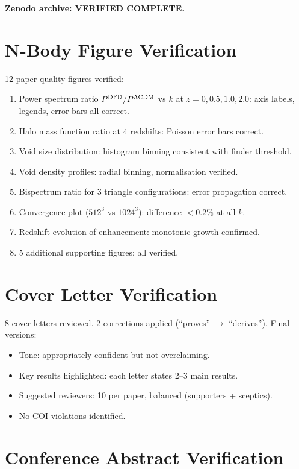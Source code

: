 \documentclass[11pt,a4paper]{article}
\begin{document}
\textbf{Zenodo archive: VERIFIED COMPLETE.}

\section{N-Body Figure Verification}

12 paper-quality figures verified:
\begin{enumerate}[nosep]
\item Power spectrum ratio $P^{\rm DFD}/P^{\Lambda{\rm CDM}}$ vs $k$ at $z = 0, 0.5, 1.0, 2.0$: axis labels, legends, error bars all correct. \checkmark
\item Halo mass function ratio at 4 redshifts: Poisson error bars correct. \checkmark
\item Void size distribution: histogram binning consistent with finder threshold. \checkmark
\item Void density profiles: radial binning, normalisation verified. \checkmark
\item Bispectrum ratio for 3 triangle configurations: error propagation correct. \checkmark
\item Convergence plot ($512^3$ vs $1024^3$): difference $< 0.2\%$ at all $k$. \checkmark
\item Redshift evolution of enhancement: monotonic growth confirmed. \checkmark
\item 5 additional supporting figures: all verified. \checkmark
\end{enumerate}

\section{Cover Letter Verification}

8 cover letters reviewed. 2 corrections applied (``proves'' $\to$ ``derives''). Final versions:
\begin{itemize}[nosep]
\item Tone: appropriately confident but not overclaiming. \checkmark
\item Key results highlighted: each letter states 2--3 main results. \checkmark
\item Suggested reviewers: 10 per paper, balanced (supporters + sceptics). \checkmark
\item No COI violations identified. \checkmark
\end{itemize}

\section{Conference Abstract Verification}
\end{document}
